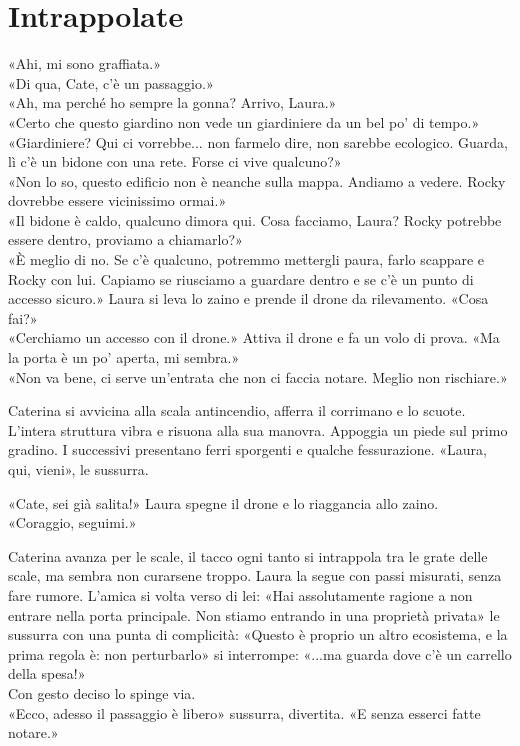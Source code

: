 \chapter{Intrappolate}

«Ahi, mi sono graffiata.»\\
«Di qua, Cate, c’\`e un passaggio.»\\
«Ah, ma perch\'e ho sempre la gonna? Arrivo, Laura.»\\
«Certo che questo giardino non vede un giardiniere da un bel po’ di tempo.»\\
«Giardiniere? Qui ci vorrebbe... non farmelo dire, non sarebbe ecologico. Guarda, l\`i c’\`e un bidone con una rete. Forse ci vive qualcuno?»\\
«Non lo so, questo edificio non \`e neanche sulla mappa. Andiamo a vedere. Rocky dovrebbe essere vicinissimo ormai.»\\
«Il bidone \`e caldo, qualcuno dimora qui. Cosa facciamo, Laura? Rocky potrebbe essere dentro, proviamo a chiamarlo?»\\
«\`E meglio di no. Se c’\`e qualcuno, potremmo mettergli paura, farlo scappare e Rocky con lui. Capiamo se riusciamo a guardare dentro e se c’\`e un punto di accesso sicuro.» Laura si leva lo zaino e prende il drone da rilevamento.
«Cosa fai?»\\
«Cerchiamo un accesso con il drone.» Attiva il drone e fa un volo di prova.
«Ma la porta \`e un po’ aperta, mi sembra.»\\
«Non va bene, ci serve un’entrata che non ci faccia notare. Meglio non rischiare.»

\par\medskip
Caterina si avvicina alla scala antincendio, afferra il corrimano e lo scuote. L'intera struttura vibra e risuona alla sua manovra. Appoggia un piede sul primo gradino. I successivi presentano ferri sporgenti e qualche fessurazione.
«Laura, qui, vieni», le sussurra.

\par\medskip
«Cate, sei gi\`a salita!» Laura spegne il drone e lo riaggancia allo zaino.\\
«Coraggio, seguimi.»

\par\medskip
Caterina avanza per le scale, il tacco ogni tanto si intrappola tra le grate delle scale, ma sembra non curarsene troppo. Laura la segue con passi misurati, senza fare rumore. L'amica si volta verso di lei:
«Hai assolutamente ragione a non entrare nella porta principale. Non stiamo entrando in una proprietà privata» le sussurra con una punta di complicità: «Questo \`e proprio un altro ecosistema, e la prima regola \`e: non perturbarlo» si interrompe: «...ma guarda dove  c’\`e un carrello della spesa!»\\
Con gesto deciso lo spinge via.\\
«Ecco, adesso il passaggio \`e libero» sussurra, divertita. «E senza esserci fatte notare.»

